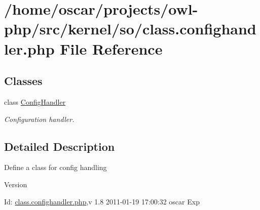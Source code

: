 \section{/home/oscar/projects/owl-\/php/src/kernel/so/class.confighandler.php File Reference}
\label{class_8confighandler_8php}
\subsection*{Classes}
\begin{DoxyCompactItemize}
\item 
class \hyperlink{classConfigHandler}{ConfigHandler}
\begin{DoxyCompactList}\small\item\em Configuration handler. \item\end{DoxyCompactList}\end{DoxyCompactItemize}


\subsection{Detailed Description}
Define a class for config handling \begin{DoxyVersion}{Version}

\end{DoxyVersion}
\begin{DoxyParagraph}{Id:}
\hyperlink{class_8confighandler_8php}{class.confighandler.php},v 1.8 2011-\/01-\/19 17:00:32 oscar Exp 
\end{DoxyParagraph}
